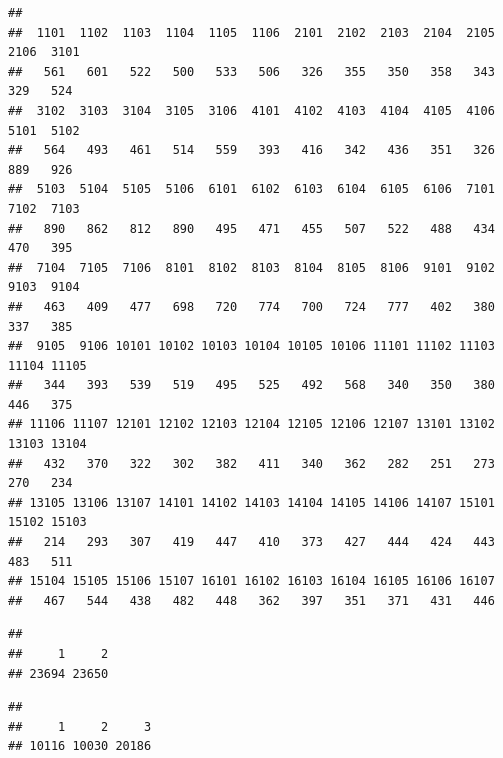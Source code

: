 \documentclass[]{book}
\newenvironment{Shaded}{\begin{snugshade}}{\end{snugshade}}
\newcommand{\KeywordTok}[1]{\textcolor[rgb]{0.13,0.29,0.53}{\textbf{#1}}}
\newcommand{\NormalTok}[1]{#1}
\newcommand{\OperatorTok}[1]{\textcolor[rgb]{0.81,0.36,0.00}{\textbf{#1}}}
\theoremstyle{definition}
\theoremstyle{definition}
\theoremstyle{definition}
\theoremstyle{definition}
\theoremstyle{remark}
\begin{document}
\begin{verbatim}
## 
##  1101  1102  1103  1104  1105  1106  2101  2102  2103  2104  2105  2106  3101 
##   561   601   522   500   533   506   326   355   350   358   343   329   524 
##  3102  3103  3104  3105  3106  4101  4102  4103  4104  4105  4106  5101  5102 
##   564   493   461   514   559   393   416   342   436   351   326   889   926 
##  5103  5104  5105  5106  6101  6102  6103  6104  6105  6106  7101  7102  7103 
##   890   862   812   890   495   471   455   507   522   488   434   470   395 
##  7104  7105  7106  8101  8102  8103  8104  8105  8106  9101  9102  9103  9104 
##   463   409   477   698   720   774   700   724   777   402   380   337   385 
##  9105  9106 10101 10102 10103 10104 10105 10106 11101 11102 11103 11104 11105 
##   344   393   539   519   495   525   492   568   340   350   380   446   375 
## 11106 11107 12101 12102 12103 12104 12105 12106 12107 13101 13102 13103 13104 
##   432   370   322   302   382   411   340   362   282   251   273   270   234 
## 13105 13106 13107 14101 14102 14103 14104 14105 14106 14107 15101 15102 15103 
##   214   293   307   419   447   410   373   427   444   424   443   483   511 
## 15104 15105 15106 15107 16101 16102 16103 16104 16105 16106 16107 
##   467   544   438   482   448   362   397   351   371   431   446
\end{verbatim}

\begin{Shaded}
\end{Shaded}

\begin{verbatim}
## 
##     1     2 
## 23694 23650
\end{verbatim}

\begin{Shaded}
\end{Shaded}

\begin{verbatim}
## 
##     1     2     3 
## 10116 10030 20186
\end{verbatim}

\begin{Shaded}
\end{Shaded}
\end{document}
